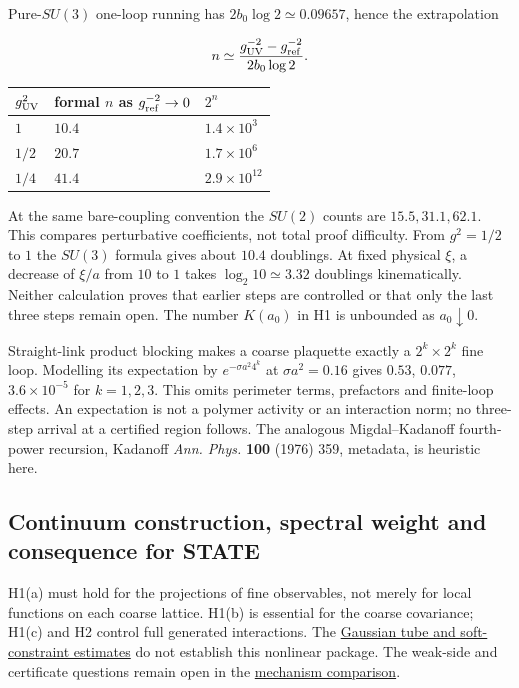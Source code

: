 \documentclass[11pt,a4paper]{article}
\begin{document}
Pure-\(SU(3)\) one-loop running has \(2b_0\log2\simeq0.09657\), hence
the extrapolation

\[n\simeq\frac{g_{\rm UV}^{-2}-g_{\rm ref}^{-2}}{2b_0\log2}.\]

\begin{longtable}[]{@{}lll@{}}
\toprule\noalign{}
\(g_{\rm UV}^2\) & formal \(n\) as \(g_{\rm ref}^{-2}\to0\) & \(2^n\) \\
\midrule\noalign{}
\endhead
\bottomrule\noalign{}
\endlastfoot
\(1\) & \(10.4\) & \(1.4\times10^3\) \\
\(1/2\) & \(20.7\) & \(1.7\times10^6\) \\
\(1/4\) & \(41.4\) & \(2.9\times10^{12}\) \\
\end{longtable}

At the same bare-coupling convention the \(SU(2)\) counts are
\(15.5,31.1,62.1\). This compares perturbative coefficients, not total
proof difficulty. From \(g^2=1/2\) to \(1\) the \(SU(3)\) formula gives
about \(10.4\) doublings. At fixed physical \(\xi\), a decrease of
\(\xi/a\) from \(10\) to \(1\) takes \(\log_2 10\simeq3.32\) doublings
kinematically. Neither calculation proves that earlier steps are
controlled or that only the last three steps remain open. The number
\(K(a_0)\) in H1 is unbounded as \(a_0\downarrow0\).

Straight-link product blocking makes a coarse plaquette exactly a
\(2^k\times2^k\) fine loop. Modelling its expectation by
\(e^{-\sigma a^2 4^k}\) at \(\sigma a^2=0.16\) gives \(0.53\),
\(0.077\), \(3.6\times10^{-5}\) for \(k=1,2,3\). This omits perimeter
terms, prefactors and finite-loop effects. An expectation is not a
polymer activity or an interaction norm; no three-step arrival at a
certified region follows. The analogous Migdal--Kadanoff fourth-power
recursion, Kadanoff \emph{Ann. Phys.} \textbf{100} (1976) 359, metadata,
is heuristic here.

\hypertarget{continuum-construction-spectral-weight-and-consequence-for-state}{%
\subsection{Continuum construction, spectral weight and consequence for
STATE}\label{continuum-construction-spectral-weight-and-consequence-for-state}}

H1(a) must hold for the projections of fine observables, not merely for
local functions on each coarse lattice. H1(b) is essential for the
coarse covariance; H1(c) and H2 control full generated interactions. The
\href{small-field-step-gaussian.md}{Gaussian tube and soft-constraint
estimates} do not establish this nonlinear package. The weak-side and
certificate questions remain open in the
\href{mass-gap-openings.md}{mechanism comparison}.
\end{document}
